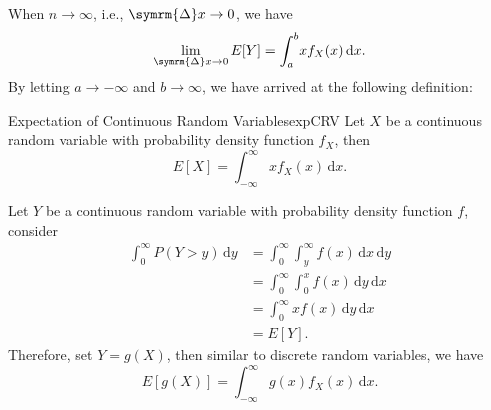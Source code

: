 \documentclass[math]{amznotes}
\theoremstyle{remark}
\begin{document}
When $n \to \infty$, i.e., $\symrm{\Delta}x \to 0$, we have
\begin{equation*}
    \lim_{\symrm{\Delta}x \to 0}E[Y] = \int_{a}^{b}\!xf_X(x)\,\mathrm{d}x.
\end{equation*}
By letting $a \to -\infty$ and $b \to \infty$, we have arrived at the following definition:
\begin{dfnbox}{Expectation of Continuous Random Variables}{expCRV}
    Let $X$ be a continuous random variable with probability density function $f_X$, then
    \begin{equation*}
        E[X] = \int_{-\infty}^{\infty}\!xf_X(x)\,\mathrm{d}x.
    \end{equation*}
\end{dfnbox}
Let $Y$ be a continuous random variable with probability density function $f$, consider
\begin{align*}
    \int_{0}^{\infty}\!P(Y > y)\,\mathrm{d}y & = \int_{0}^{\infty}\!\int_{y}^{\infty}\!f(x)\,\mathrm{d}x\,\mathrm{d}y \\
    & = \int_{0}^{\infty}\!\int_{0}^{x}\!f(x)\,\mathrm{d}y\,\mathrm{d}x \\ 
    & = \int_{0}^{\infty}\!xf(x)\,\mathrm{d}y\,\mathrm{d}x \\ 
    & = E[Y].
\end{align*}
Therefore, set $Y = g(X)$, then similar to discrete random variables, we have
\begin{equation*}
    E\left[g(X)\right] = \int_{-\infty}^{\infty}\!g(x)f_X(x)\,\mathrm{d}x.
\end{equation*}
\end{document}

